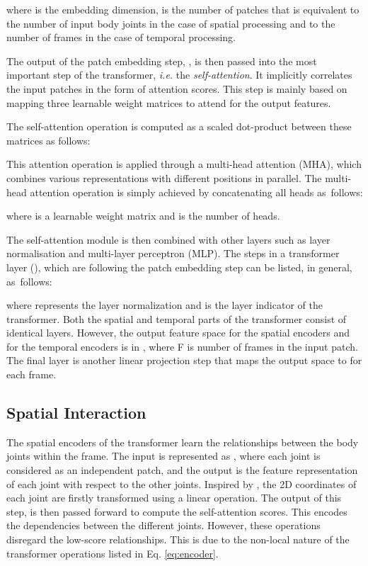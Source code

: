 \documentclass[runningheads]{llncs}
\newcommand{\latinphrase}[1]{\textit{#1}}
\newcommand{\ie}{\latinphrase{i.e.}\xspace}
\begin{document}
where  is the embedding dimension,  is the number of patches that is equivalent to the number of input body joints in the case of spatial processing and to the number of frames in the case of temporal processing. 

The output of the patch embedding step, , is then passed into the most important step of the transformer, \ie the \textit{self-attention}. It implicitly correlates the input patches in the form of attention scores. This step is mainly based on mapping three learnable weight matrices  to attend for the output features. 

The self-attention operation is computed as a scaled dot-product between these matrices as follows:

This attention operation is applied through a multi-head attention (MHA), which combines various representations with different positions in parallel. The multi-head attention operation is simply achieved by concatenating all heads as~follows:

where  is a learnable weight matrix and  is the number of heads.

The self-attention module is then combined with other layers such as layer normalisation \cite{wu2018group} and multi-layer perceptron (MLP). The steps in a transformer layer (), which are following the patch embedding step can be listed, in general, as~follows:

where  represents the layer normalization and  is the layer indicator of the transformer. Both the spatial and temporal parts of the transformer consist of identical layers. However, the output feature space for the spatial encoders  and for the temporal encoders is in , where F is number of frames in the input patch. The final layer is another linear projection step that maps the output space to  for each frame.

\subsection{Spatial Interaction}
\label{sec:spatial}
The spatial encoders of the transformer learn the relationships between the body joints within the frame. The input is represented as , where each joint is considered as an independent patch, and the output is the feature representation of each joint with respect to the other joints. Inspired by \cite{poseformer}, the 2D coordinates of each joint are firstly transformed using a linear operation. The output of this step,  is then passed forward to compute the self-attention scores. This encodes the dependencies between the different joints. However, these operations disregard the low-score relationships. This is due to the non-local nature of the transformer operations listed in Eq. \ref{eq:encoder}. 
\end{document}
